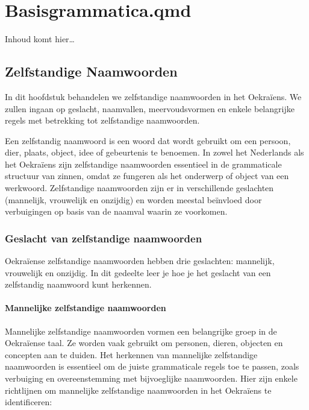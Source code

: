 \documentclass[
  letterpaper,
  DIV=11,
  numbers=noendperiod]{scrreprt}
\begin{document}
\part{Basisgrammatica.qmd}

Inhoud komt hier\ldots{}

\hypertarget{sec-zelfstandige-naamwoorden}{%
\chapter{Zelfstandige Naamwoorden}\label{sec-zelfstandige-naamwoorden}}

In dit hoofdstuk behandelen we zelfstandige naamwoorden in het
Oekraïens. We zullen ingaan op geslacht, naamvallen, meervoudsvormen en
enkele belangrijke regels met betrekking tot zelfstandige naamwoorden.

Een zelfstandig naamwoord is een woord dat wordt gebruikt om een
persoon, dier, plaats, object, idee of gebeurtenis te benoemen. In zowel
het Nederlands als het Oekraïens zijn zelfstandige naamwoorden
essentieel in de grammaticale structuur van zinnen, omdat ze fungeren
als het onderwerp of object van een werkwoord. Zelfstandige naamwoorden
zijn er in verschillende geslachten (mannelijk, vrouwelijk en onzijdig)
en worden meestal beïnvloed door verbuigingen op basis van de naamval
waarin ze voorkomen.

\hypertarget{geslacht-van-zelfstandige-naamwoorden}{%
\section{Geslacht van zelfstandige
naamwoorden}\label{geslacht-van-zelfstandige-naamwoorden}}

Oekraïense zelfstandige naamwoorden hebben drie geslachten: mannelijk,
vrouwelijk en onzijdig. In dit gedeelte leer je hoe je het geslacht van
een zelfstandig naamwoord kunt herkennen.

\hypertarget{mannelijke-zelfstandige-naamwoorden}{%
\subsection{Mannelijke zelfstandige
naamwoorden}\label{mannelijke-zelfstandige-naamwoorden}}

Mannelijke zelfstandige naamwoorden vormen een belangrijke groep in de
Oekraïense taal. Ze worden vaak gebruikt om personen, dieren, objecten
en concepten aan te duiden. Het herkennen van mannelijke zelfstandige
naamwoorden is essentieel om de juiste grammaticale regels toe te
passen, zoals verbuiging en overeenstemming met bijvoeglijke
naamwoorden. Hier zijn enkele richtlijnen om mannelijke zelfstandige
naamwoorden in het Oekraïens te identificeren:
\end{document}
